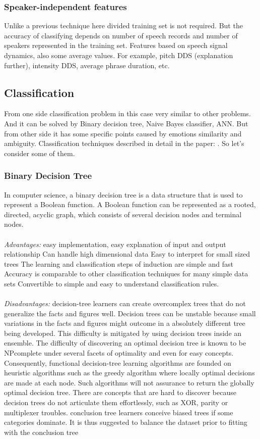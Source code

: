 \documentclass[12pt, letterpaper]{article}
\begin{document}
\subsubsection{Speaker-independent features}
Unlike a previous technique here divided training set is not required. But the accuracy of classifying depends on number of speech records and number of speakers represented in the training set. Features based on speech signal dynamics, also some average values. For example, pitch DDS (explanation further), intensity DDS, average phrase duration, etc.


\subsection{Classification}
From one side classification problem in this case very similar to other problems. And it can be solved by Binary decision tree, Naive Bayes classifier, ANN. But from other side it has some specific points caused by emotions similarity and ambiguity. Classification techniques described in detail in the paper: \cite["Speaker Emotion Recognition Based on Speech Features and Classification Techniques"]{SirishaSirvinasSiva}. So let's consider some of them.
\subsubsection{Binary   Decision Tree}
In computer science, a binary decision tree is a data structure that is used to represent a Boolean function. A Boolean function can be represented as a rooted, directed, acyclic graph, which consists of several decision nodes and terminal nodes.
\\
\\
\emph{Advantages:} easy implementation, easy explanation of input and output relationship Can handle high dimensional data Easy to interpret for small sized trees The learning and classification steps of induction are simple and fast Accuracy is comparable to other classification techniques for many simple data sets Convertible to simple and easy to understand classification rules.
\\
\\
\emph{Disadvantages:} decision-tree learners can create overcomplex trees that do not generalize the facts and figures well. Decision trees can be unstable because small variations in the facts and figures might outcome in a absolutely different tree being developed. This difficulty is mitigated by using decision trees inside an ensemble. The difficulty of discovering an optimal decision tree is known to be NPcomplete under several facets of optimality and even for easy concepts. Consequently, functional decision-tree learning algorithms are founded on heuristic algorithms such as the greedy algorithm where locally optimal decisions are made at each node. Such algorithms will not assurance to return the globally optimal decision tree. There are concepts that are hard to discover because decision trees do not articulate them effortlessly, such as XOR, parity or multiplexer troubles. conclusion tree learners conceive biased trees if some categories dominate. It is thus suggested to balance the dataset prior to fitting with the conclusion tree
\\
\\
\end{document}
